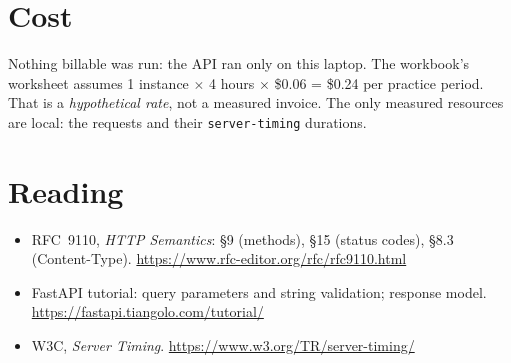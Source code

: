 \documentclass[11pt,a4paper]{article}
\newcommand{\code}[1]{\texttt{#1}}
\begin{document}
\section{Cost}

Nothing billable was run: the API ran only on this laptop. The workbook's
worksheet assumes 1 instance $\times$ 4 hours $\times$ \$0.06 = \$0.24 per
practice period. That is a \emph{hypothetical rate}, not a measured invoice.
The only measured resources are local: the requests and their
\code{server-timing} durations.

\section{Reading}
\begin{itemize}
  \item RFC~9110, \emph{HTTP Semantics}:
        \S9 (methods), \S15 (status codes), \S8.3 (Content-Type).
        \url{https://www.rfc-editor.org/rfc/rfc9110.html}
  \item FastAPI tutorial: query parameters and string validation; response
        model. \url{https://fastapi.tiangolo.com/tutorial/}
  \item W3C, \emph{Server Timing}. \url{https://www.w3.org/TR/server-timing/}
\end{itemize}
\end{document}
